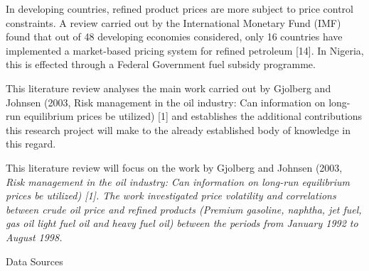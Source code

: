 \documentclass[12pt,twoside]{article}
\begin{document}
\begin{justify}
{\fontsize{11pt}{13.2pt}\selectfont In developing countries, refined product prices are more subject to price control constraints. A review carried out by the International Monetary Fund (IMF) found that out of 48 developing economies considered, only 16 countries have implemented a market-based pricing system for refined petroleum \textcolor[HTML]{FF0000}{[14]. In Nigeria, this is effected through a Federal Government fuel subsidy programme.}\par}
\end{justify}\par

\begin{justify}
{\fontsize{11pt}{13.2pt}\selectfont This literature review analyses the main work carried out by Gjolberg and Johnsen (2003, Risk management in the oil industry: Can information on long-run equilibrium prices be utilized) [1] and establishes the additional contributions this research project will make to the already established body of knowledge in this regard.\par}
\end{justify}\par

{\fontsize{11pt}{13.2pt}\selectfont \par}
\par

\begin{justify}
{\fontsize{11pt}{13.2pt}\selectfont This literature review will focus on the work by Gjolberg and Johnsen (2003, \textit{Risk management in the oil industry: Can information on long-run equilibrium prices be utilized) \textcolor[HTML]{FF0000}{[1]. The work investigated price volatility and correlations between crude oil price and refined products (Premium gasoline, naphtha, jet fuel, gas oil light fuel oil and heavy fuel oil) between the periods from January 1992 to August 1998.}}\par}
\end{justify}\par

\begin{justify}
{\fontsize{11pt}{13.2pt}\selectfont Data Sources\par}
\end{justify}\par
\end{document}
